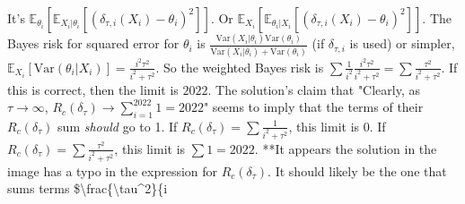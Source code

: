\begin{enumerate}
It's $\mathbb{E}_{\theta_i}[\mathbb{E}_{X_i|\theta_i}[(\delta_{\tau,i}(X_i)-\theta_i)^2]]$.
Or $\mathbb{E}_{X_i}[\mathbb{E}_{\theta_i|X_i}[(\delta_{\tau,i}(X_i)-\theta_i)^2]]$.
The Bayes risk for squared error for $\theta_i$ is $\frac{\text{Var}(X_i|\theta_i) \text{Var}(\theta_i)}{\text{Var}(X_i|\theta_i)+\text{Var}(\theta_i)}$ (if $\delta_{\tau,i}$ is used) or simpler, $\mathbb{E}_{X_i}[\text{Var}(\theta_i|X_i)] = \frac{i^2\tau^2}{i^2+\tau^2}$.
So the weighted Bayes risk is $\sum \frac{1}{i^2} \frac{i^2\tau^2}{i^2+\tau^2} = \sum \frac{\tau^2}{i^2+\tau^2}$.
If this is correct, then the limit is $2022$.
The solution's claim that "Clearly, as $\tau \to \infty$, $R_c(\delta_\tau) \to \sum_{i=1}^{2022} 1 = 2022$" seems to imply that the terms of their $R_c(\delta_\tau)$ sum \textit{should} go to 1.
If $R_c(\delta_\tau) = \sum \frac{1}{i^2+\tau^2}$, this limit is $0$.
If $R_c(\delta_\tau) = \sum \frac{\tau^2}{i^2+\tau^2}$, this limit is $\sum 1 = 2022$.
**It appears the solution in the image has a typo in the expression for $R_c(\delta_\tau)$. It should likely be the one that sums terms \$\textbackslash{}frac\{\textbackslash{}tau^2\}\{i
\end{enumerate}
